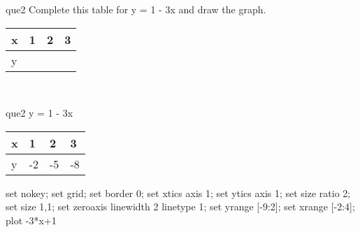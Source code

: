 \documentclass[13.5pt, varwidth=true]{beamer}
\begin{document}
\begin{frame}[shrink=19,fragile]
	\begin{beamercolorbox}[rounded=true, left, shadow=true,wd=14.8cm]{que2}
		 Complete this table for y = 1 - 3x and draw the graph. \\[0.3cm] \renewcommand{\arraystretch}{1.2}\begin{tabular}{|C|C|C|C|} \hline x & 1 & 2 & 3 \\ \hline y & & & \\ \hline \end{tabular}\\[0.3cm]
	\end{beamercolorbox}
\end{frame}
\begin{frame}[shrink=19,fragile]
	\begin{beamercolorbox}[rounded=true, left, shadow=true,wd=14.8cm]{que2}
		y = 1 - 3x\renewcommand{\arraystretch}{1.2}\begin{tabular}{|C|C|C|C|} \hline x & 1 & 2 & 3 \\ \hline y & -2 & -5 & -8\\ \hline \end{tabular}\begin{gnuplot}[terminal=pdf] set nokey; set grid; set border 0; set xtics axis 1; set ytics axis 1; set size ratio 2; set size 1,1; set zeroaxis linewidth 2 linetype 1; set yrange [-9:2]; set xrange [-2:4]; plot -3*x+1 \end{gnuplot}
	\end{beamercolorbox}
\end{frame}
\end{document}
